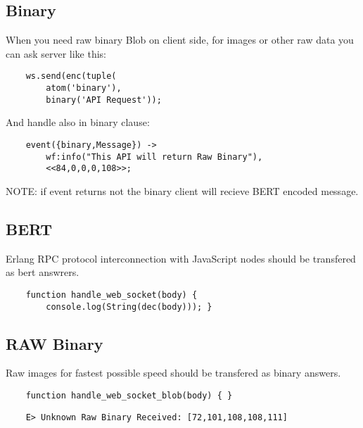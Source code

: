 \subsection{Binary}

When you need raw binary Blob on client side,
for images or other raw data you can ask server like this:

\vspace{1\baselineskip}
\begin{lstlisting}
    ws.send(enc(tuple(
        atom('binary'),
        binary('API Request'));
\end{lstlisting}
\vspace{1\baselineskip}

And handle also in binary clause:

\vspace{1\baselineskip}
\begin{lstlisting}
    event({binary,Message}) ->
        wf:info("This API will return Raw Binary"),
        <<84,0,0,0,108>>;
\end{lstlisting}
\vspace{1\baselineskip}

NOTE: if event returns not the binary client will recieve BERT encoded message.

\subsection*{BERT}

Erlang RPC protocol interconnection with JavaScript nodes should be transfered as bert answrers.

\begin{lstlisting}
    function handle_web_socket(body) {
        console.log(String(dec(body))); }
\end{lstlisting}

\subsection*{RAW Binary}

Raw images for fastest possible speed should be transfered as binary answers.

\begin{lstlisting}
    function handle_web_socket_blob(body) { }
\end{lstlisting}

\begin{lstlisting}
    E> Unknown Raw Binary Received: [72,101,108,108,111]
\end{lstlisting}

